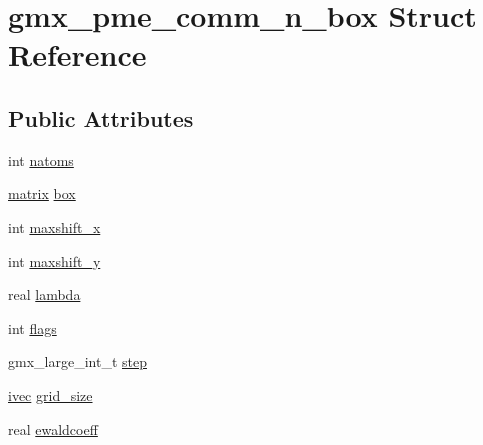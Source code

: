 \hypertarget{structgmx__pme__comm__n__box}{\section{gmx\-\_\-pme\-\_\-comm\-\_\-n\-\_\-box \-Struct \-Reference}
\label{structgmx__pme__comm__n__box}
}
\subsection*{\-Public \-Attributes}
\begin{DoxyCompactItemize}
\item 
int \hyperlink{structgmx__pme__comm__n__box_aa539f8089c065474cfe199f806a60246}{natoms}
\item 
\hyperlink{share_2template_2gromacs_2types_2simple_8h_a7ea9c2a830d3f743b887387e33645a83}{matrix} \hyperlink{structgmx__pme__comm__n__box_aeadb88e7e84b9ae8c0ffc1c5af9e2d50}{box}
\item 
int \hyperlink{structgmx__pme__comm__n__box_a6fa23ffd2d899504a68a5f5b66d7c4f9}{maxshift\-\_\-x}
\item 
int \hyperlink{structgmx__pme__comm__n__box_a3a5b3a1f258084e7bc60b53a4f01c6e1}{maxshift\-\_\-y}
\item 
real \hyperlink{structgmx__pme__comm__n__box_ae2cf20476322a735a09b9e87df1eaa27}{lambda}
\item 
int \hyperlink{structgmx__pme__comm__n__box_add61ee7d34ab5eb0c425aff8fe172d1b}{flags}
\item 
gmx\-\_\-large\-\_\-int\-\_\-t \hyperlink{structgmx__pme__comm__n__box_ae169f7360bdc6f86e3c5d06675abad63}{step}
\item 
\hyperlink{share_2template_2gromacs_2types_2simple_8h_a74f6ffdb4a9c1764f5293969d8c681b6}{ivec} \hyperlink{structgmx__pme__comm__n__box_af27110459981ea30163adfce49b836dd}{grid\-\_\-size}
\item 
real \hyperlink{structgmx__pme__comm__n__box_aa1873db58b59fcdf9982ee5e91aa30ba}{ewaldcoeff}
\end{DoxyCompactItemize}


